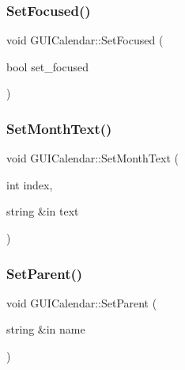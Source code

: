 \hypertarget{class_g_u_i_calendar_ad74701164732d122776bbf705f5b9417}{}\label{class_g_u_i_calendar_ad74701164732d122776bbf705f5b9417} 
\subsubsection{\texorpdfstring{Set\+Focused()}{SetFocused()}}
{\footnotesize\ttfamily void G\+U\+I\+Calendar\+::\+Set\+Focused (\begin{DoxyParamCaption}\item[{bool}]{set\+\_\+focused }\end{DoxyParamCaption})}

\hypertarget{class_g_u_i_calendar_afb09ad1e0fdcf9adf6cc6f646dca22f1}{}\label{class_g_u_i_calendar_afb09ad1e0fdcf9adf6cc6f646dca22f1} 
\subsubsection{\texorpdfstring{Set\+Month\+Text()}{SetMonthText()}}
{\footnotesize\ttfamily void G\+U\+I\+Calendar\+::\+Set\+Month\+Text (\begin{DoxyParamCaption}\item[{int}]{index,  }\item[{string \&in}]{text }\end{DoxyParamCaption})}

\hypertarget{class_g_u_i_calendar_af2a571544aebf75727af0495d8e00803}{}\label{class_g_u_i_calendar_af2a571544aebf75727af0495d8e00803} 
\subsubsection{\texorpdfstring{Set\+Parent()}{SetParent()}}
{\footnotesize\ttfamily void G\+U\+I\+Calendar\+::\+Set\+Parent (\begin{DoxyParamCaption}\item[{string \&in}]{name }\end{DoxyParamCaption})}

\hypertarget{class_g_u_i_calendar_a6be34e394f62c81e7e3bd1fb7ccae5c1}{}\label{class_g_u_i_calendar_a6be34e394f62c81e7e3bd1fb7ccae5c1} 
